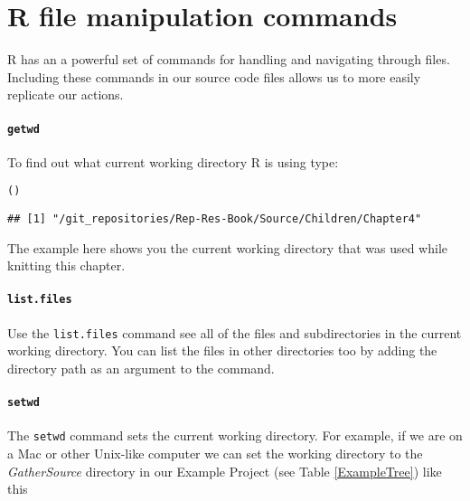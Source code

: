 {%
\section{R file manipulation commands}

R has an a powerful set of commands for handling and navigating through files. Including these commands in our source code files allows us to more easily replicate our actions.

\paragraph{{\tt{getwd}}}

To find out what current working directory R is using type:

\begin{knitrout}
\color{fgcolor}\begin{kframe}
\begin{alltt}
()
\end{alltt}
\begin{verbatim}
## [1] "/git_repositories/Rep-Res-Book/Source/Children/Chapter4"
\end{verbatim}
\end{kframe}
\end{knitrout}


\noindent The example here shows you the current working directory that was used while knitting this chapter.

\paragraph{{\tt{list.files}}}

Use the \texttt{list.files} command see all of the files and subdirectories in the current working directory. You can list the files in other directories too by adding the directory path as an argument to the command.  

\paragraph{{\tt{setwd}}}

The {\tt{setwd}} command sets the current working directory. For example, if we are on a Mac or other Unix-like computer we can set the working directory to the {\emph{GatherSource}} directory in our Example Project (see Table \ref{ExampleTree}) like this

}
